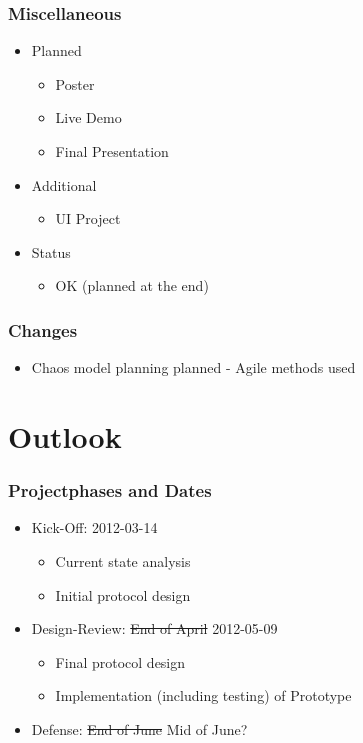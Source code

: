 \documentclass{beamer}
\begin{document}
\frame
{
  \frametitle{Miscellaneous}
  \begin{itemize}
      \item Planned
      \begin{itemize}
          \item Poster
          \item Live Demo
          \item Final Presentation
      \end{itemize}
      \item Additional
      \begin{itemize}
          \item UI Project
      \end{itemize}
      \item Status
      \begin{itemize}
          \item OK (planned at the end)
      \end{itemize}
  \end{itemize}
}

\frame
{
  \frametitle{Changes}
  \begin{itemize}
    \item Chaos model planning planned - \alert{Agile methods used}
  \end{itemize}
}

\section{Outlook}
\frame
{
  \frametitle{Projectphases and Dates}
  \begin{itemize}
     \item Kick-Off: 2012-03-14
      \begin{itemize}
         \item Current state analysis
         \item Initial protocol design
      \end{itemize}
     \item Design-Review: \sout{End of April} \alert{2012-05-09}
     \begin{itemize}
         \item Final protocol design
         \item Implementation (including testing) of Prototype
     \end{itemize}
     \item Defense: \sout{End of June} \alert{Mid of June?}
  \end{itemize}
}
\end{document}
